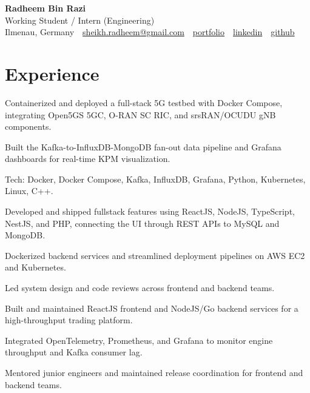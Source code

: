 \documentclass[10pt,a4paper]{resume}
\makeatletter
\newcommand{\Portfolio}{https://radheem.github.io/my-cv}
\newcommand{\PortfolioText}{portfolio}
\newcommand{\GitHub}{https://github.com/radheem}
\newcommand{\LinkedIn}{https://www.linkedin.com/in/radheem-razi}
\newcommand{\Email}{sheikh.radheem@gmail.com}
\makeatother
\begin{document}
\begin{center}
  {\huge\bfseries Radheem Bin Razi}\\[3pt]
  {\large Working Student / Intern (Engineering)}\\[6pt]
  \small
  Ilmenau, Germany \,\textbar\,
  \href{mailto:\Email}{\Email} \,\textbar\,
  \href{\Portfolio}{\PortfolioText} \,\textbar\,
  \href{\LinkedIn}{linkedin} \,\textbar\,
  \href{\GitHub}{github}
\end{center}
\vspace{2pt}

\section{Experience}

\bullets
  \item Containerized and deployed a full-stack 5G testbed with Docker Compose, integrating Open5GS 5GC, O-RAN SC RIC, and srsRAN/OCUDU gNB components.
  \item Built the Kafka-to-InfluxDB-MongoDB fan-out data pipeline and Grafana dashboards for real-time KPM visualization.
  \item Tech: Docker, Docker Compose, Kafka, InfluxDB, Grafana, Python, Kubernetes, Linux, C++.
\bulletsend
\vspace{1.5pt}
\bullets
  \item Developed and shipped fullstack features using ReactJS, NodeJS, TypeScript, NestJS, and PHP, connecting the UI through REST APIs to MySQL and MongoDB.
  \item Dockerized backend services and streamlined deployment pipelines on AWS EC2 and Kubernetes.
  \item Led system design and code reviews across frontend and backend teams.
\bulletsend
\vspace{1.5pt}
\bullets
  \item Built and maintained ReactJS frontend and NodeJS/Go backend services for a high-throughput trading platform.
  \item Integrated OpenTelemetry, Prometheus, and Grafana to monitor engine throughput and Kafka consumer lag.
  \item Mentored junior engineers and maintained release coordination for frontend and backend teams.
\bulletsend
\vspace{1.5pt}
\end{document}
